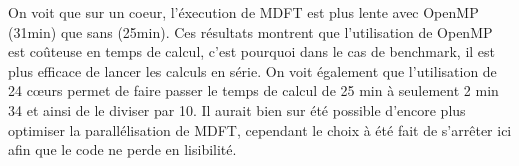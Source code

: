 On voit que sur un coeur, l'éxecution de MDFT est plus lente avec OpenMP (31min) que sans (25min). Ces résultats montrent que l'utilisation de OpenMP est co\^uteuse en temps de calcul, c'est pourquoi dans le cas de benchmark, il est plus efficace de lancer les calculs en série. On voit également que l'utilisation de 24 cœurs permet de faire passer le temps de calcul de 25 min à seulement 2 min 34 et ainsi de le diviser par 10. Il aurait bien sur été possible d'encore plus optimiser la parallélisation de MDFT, cependant le choix à été fait de s’arrêter ici afin que le code ne perde en lisibilité.





\vspace{4\baselineskip}

